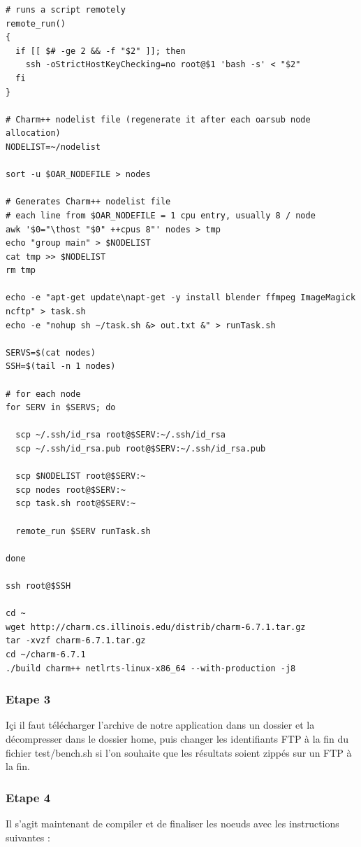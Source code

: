 \documentclass[a4paper, 11pt, titlepage]{article}
\begin{document}
\begin{verbatim}
# runs a script remotely
remote_run()
{
  if [[ $# -ge 2 && -f "$2" ]]; then
    ssh -oStrictHostKeyChecking=no root@$1 'bash -s' < "$2"
  fi
}

# Charm++ nodelist file (regenerate it after each oarsub node allocation)
NODELIST=~/nodelist

sort -u $OAR_NODEFILE > nodes

# Generates Charm++ nodelist file
# each line from $OAR_NODEFILE = 1 cpu entry, usually 8 / node
awk '$0="\thost "$0" ++cpus 8"' nodes > tmp
echo "group main" > $NODELIST
cat tmp >> $NODELIST
rm tmp

echo -e "apt-get update\napt-get -y install blender ffmpeg ImageMagick ncftp" > task.sh
echo -e "nohup sh ~/task.sh &> out.txt &" > runTask.sh

SERVS=$(cat nodes)
SSH=$(tail -n 1 nodes)

# for each node
for SERV in $SERVS; do

  scp ~/.ssh/id_rsa root@$SERV:~/.ssh/id_rsa
  scp ~/.ssh/id_rsa.pub root@$SERV:~/.ssh/id_rsa.pub

  scp $NODELIST root@$SERV:~
  scp nodes root@$SERV:~
  scp task.sh root@$SERV:~

  remote_run $SERV runTask.sh

done

ssh root@$SSH

cd ~
wget http://charm.cs.illinois.edu/distrib/charm-6.7.1.tar.gz
tar -xvzf charm-6.7.1.tar.gz
cd ~/charm-6.7.1
./build charm++ netlrts-linux-x86_64 --with-production -j8
\end{verbatim}



\subsubsection {Etape 3}

Içi il faut télécharger l'archive de notre application dans un dossier et la décompresser dans le dossier home, puis changer les identifiants FTP à la fin du fichier test/bench.sh si l'on souhaite que les résultats soient zippés sur un FTP à la fin.


\subsubsection {Etape 4}

Il s'agit maintenant de compiler et de finaliser les noeuds avec les instructions suivantes :
\end{document}
